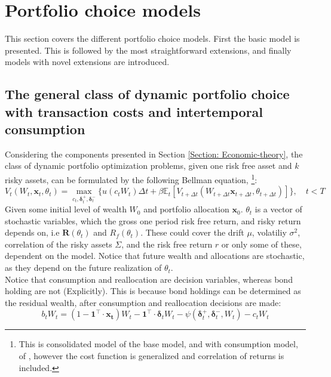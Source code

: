 \documentclass[11pt]{article}
\begin{document}
\fi

\section{Portfolio choice models} \label{Section: Portfolio-choice-models}
This section covers the different portfolio choice models.
First the basic model is presented. This is followed by the most straightforward extensions,
and finally models with novel extensions are introduced.
\subsection{The general class of dynamic portfolio choice with transaction costs and intertemporal consumption} \label{Subsection: Dynamic-portfolio-choice} 
Considering the components presented in Section \ref{Section: Economic-theory},
the class of dynamic portfolio optimization problems, given one risk free asset and $k$ risky assets, can be formulated 
by the following Bellman equation, \textcite{Bellman1958}\footnote{This is consolidated model of the base model, and with consumption model, of \textcite{CaiJuddXu2020},
however the cost function is generalized and correlation of returns is included.}:
\begin{equation} \label{eq: class_bellman_non_normalized}
  V_{t} (W_t , \mathbf{x}_{t}, \theta_t) = \max_{c_t , \boldsymbol{\delta}^{+}_{t}, \boldsymbol{\delta}^{-}_{t}  } \{ u(c_t W_t ) 
  \Delta t + \beta \mathbb{E}_{t} \left[ 
    V_{t+\Delta t} (W_{t+\Delta t } \mathbf{x}_{t+\Delta t }, \theta_{t + \Delta t }  ) 
    \right] \}, \quad t < T 
\end{equation}
Given some initial level of wealth $W_0$ and portfolio allocation $\mathbf{x}_0$. \( \theta_t \) is a vector of stochastic variables, which
the gross one period risk free return, and risky return depends on, i.e \( \mathbf{R}(\theta_t) \) and \( R_f (\theta_t) \).
These could cover the drift $\mu $, volatiliy $\sigma^{2}$, correlation of the risky assets $\Sigma$, and the risk free return $r$ or only some of these, dependent on the model.
Notice that future wealth and allocations are stochastic, as they depend on the future realization of $\theta_t$.\\
Notice that consumption and reallocation are decision variables, whereas bond holding are not (Explicitly).
This is because bond holdings can be determined as the residual wealth, after consumption and reallocation decisions are made:
\begin{equation}\label{eq: class_bond_holdings_non_normalized}
  b_{t} W_t = \left( 1 - \mathbf{1}^{\top} \cdot \mathbf{x_t}  \right) W_t - \mathbf{1}^{\top} \cdot \boldsymbol{\delta}_t W_t 
  - \psi (\boldsymbol{\delta}^{+}_{t}, \boldsymbol{\delta}^{-}_t , W_t)
  - c_t W_t
\end{equation}
\end{document}
